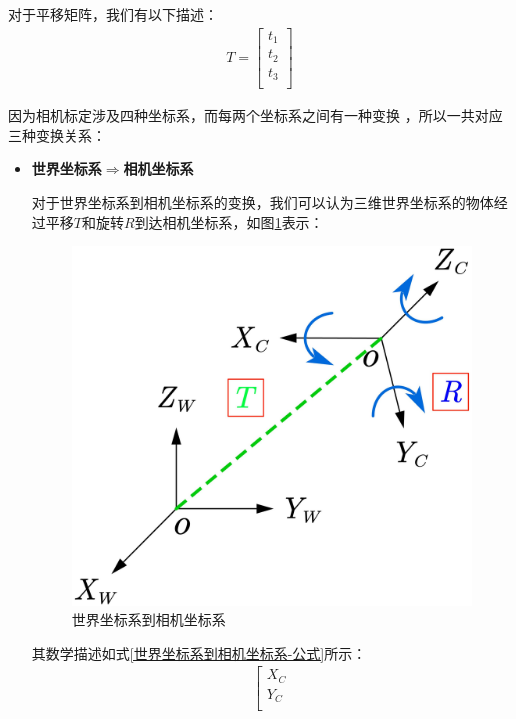 \documentclass{article}
\begin{document}
对于平移矩阵，我们有以下描述：
\begin{gather}
	T=\left[ \begin{array}{c}
		t_1\\
		t_2\\
		t_3\\
	\end{array} \right] 
\end{gather}

因为相机标定涉及四种坐标系，而每两个坐标系之间有一种变换
，所以一共对应三种变换关系：
\begin{itemize}
		\item \textbf{世界坐标系$\Longrightarrow$相机坐标系}
		
		对于世界坐标系到相机坐标系的变换，我们可以认为三维世界坐标系的物体经过平移$T$和旋转$R$到达相机坐标系，如图\ref{世界坐标系到相机坐标系-图}表示：
		\begin{figure}[H]
			\begin{center}
				\includegraphics[scale=0.8]{世界坐标系到相机坐标系}
				\caption{世界坐标系到相机坐标系}
				\label{世界坐标系到相机坐标系-图}
			\end{center}
		\end{figure}
		其数学描述如式\ref{世界坐标系到相机坐标系-公式}所示：
		\begin{gather}
			\left[ \begin{array}{c}
				X_C\\
				Y_C\\

\end{array}
\end{gather}
\end{itemize}
\end{document}
